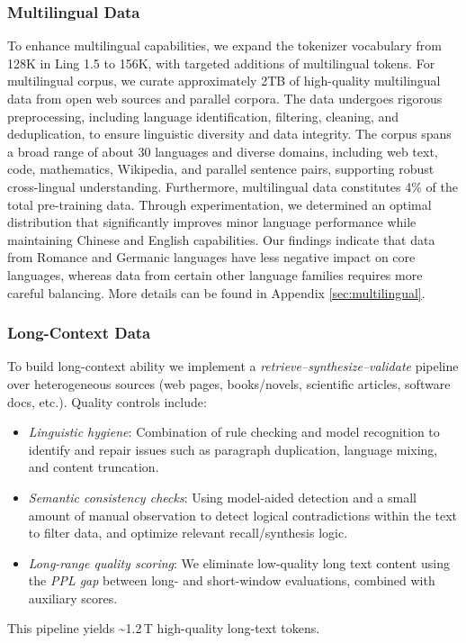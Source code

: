 \subsubsection{Multilingual Data}

To enhance multilingual capabilities, we expand the tokenizer vocabulary from 128K in Ling 1.5 to 156K, with targeted additions of multilingual tokens. For multilingual corpus, we curate approximately 2TB of high-quality multilingual data from open web sources and parallel corpora. The data undergoes rigorous preprocessing, including language identification, filtering, cleaning, and deduplication, to ensure linguistic diversity and data integrity. The corpus spans a broad range of about 30 languages and diverse domains, including web text, code, mathematics, Wikipedia, and parallel sentence pairs, supporting robust cross-lingual understanding. Furthermore, multilingual data constitutes 4\% of the total pre-training data. Through experimentation, we determined an optimal distribution that significantly improves minor language performance while maintaining Chinese and English capabilities. Our findings indicate that data from Romance and Germanic languages have less negative impact on core languages, whereas data from certain other language families requires more careful balancing. More details can be found in Appendix \ref{sec:multilingual}.


\subsubsection{Long-Context Data} 
To build long-context ability we implement a \emph{retrieve–synthesize–validate} pipeline over heterogeneous sources (web pages, books/novels, scientific articles, software docs, etc.). Quality controls include: 
\begin{itemize}
    \item \emph{Linguistic hygiene}: Combination of rule checking and model recognition to identify and repair issues such as paragraph duplication, language mixing, and content truncation.
    \item \emph{Semantic consistency checks}: Using model-aided detection and a small amount of manual observation to detect logical contradictions within the text to filter data, and optimize relevant recall/synthesis logic.
    \item \emph{Long-range quality scoring}: We eliminate low-quality long text content using the \emph{PPL gap} between long- and short-window evaluations, combined with auxiliary scores. 
\end{itemize}
This pipeline yields \textasciitilde1.2\,\textsc{T} high-quality long-text tokens.


